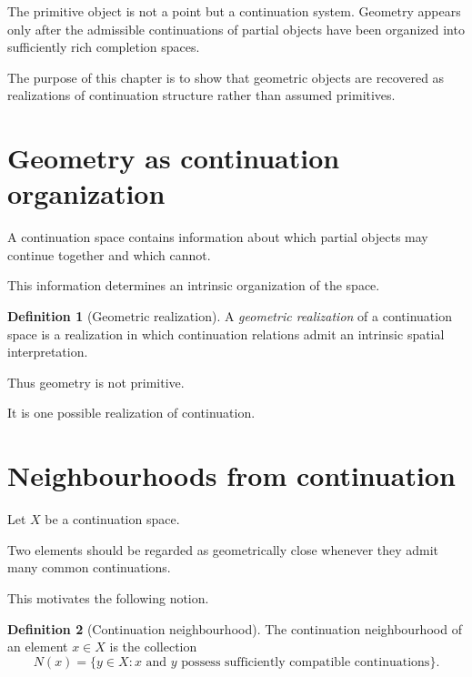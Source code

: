 \documentclass[13pt,openany]{book}
\theoremstyle{plain}
\theoremstyle{definition}
\newtheorem{definition}{Definition}[chapter]
\begin{document}
The primitive object is not a point but a continuation system. Geometry
appears only after the admissible continuations of partial objects have been
organized into sufficiently rich completion spaces.

The purpose of this chapter is to show that geometric objects are recovered as
realizations of continuation structure rather than assumed primitives.

\section{Geometry as continuation organization}

A continuation space contains information about which partial objects may
continue together and which cannot.

This information determines an intrinsic organization of the space.

\begin{definition}[Geometric realization]
A \emph{geometric realization} of a continuation space is a realization in
which continuation relations admit an intrinsic spatial interpretation.
\end{definition}

Thus geometry is not primitive.

It is one possible realization of continuation.

\section{Neighbourhoods from continuation}

Let $X$ be a continuation space.

Two elements should be regarded as geometrically close whenever they admit
many common continuations.

This motivates the following notion.

\begin{definition}[Continuation neighbourhood]
The continuation neighbourhood of an element $x\in X$ is the collection
\[
N(x)
=
\{y\in X:
x\text{ and }y
\text{ possess sufficiently compatible continuations}\}.
\]
\end{definition}
\end{document}
